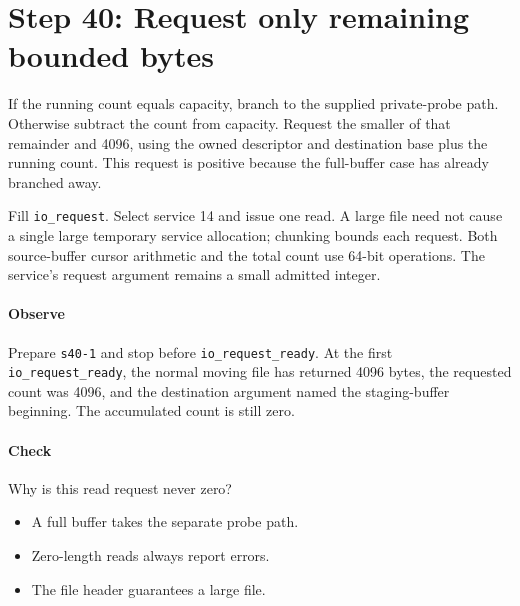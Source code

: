 \section{Step 40: Request only remaining bounded bytes}
If the running count equals capacity, branch to the supplied private-probe
path. Otherwise subtract the count from capacity. Request the smaller of that
remainder and 4096, using the owned descriptor and destination base plus the
running count. This request is positive because the full-buffer case has already
branched away.

Fill \texttt{io\_request}. Select service 14 and issue one read. A large file
need not cause a single large temporary service allocation; chunking bounds each
request. Both source-buffer cursor arithmetic and the total count use 64-bit
operations. The service's request argument remains a small admitted integer.

\paragraph{Observe} Prepare \texttt{s40-1} and stop before
\texttt{io\_request\_ready}. At the first \texttt{io\_request\_ready}, the normal moving
file has returned 4096 bytes, the requested count was 4096, and the destination
argument named the staging-buffer beginning. The accumulated count is still zero.

\paragraph{Check} Why is this read request never zero?
\begin{itemize}
\item[A.] A full buffer takes the separate probe path.
\item[B.] Zero-length reads always report errors.
\item[C.] The file header guarantees a large file.
\end{itemize}
